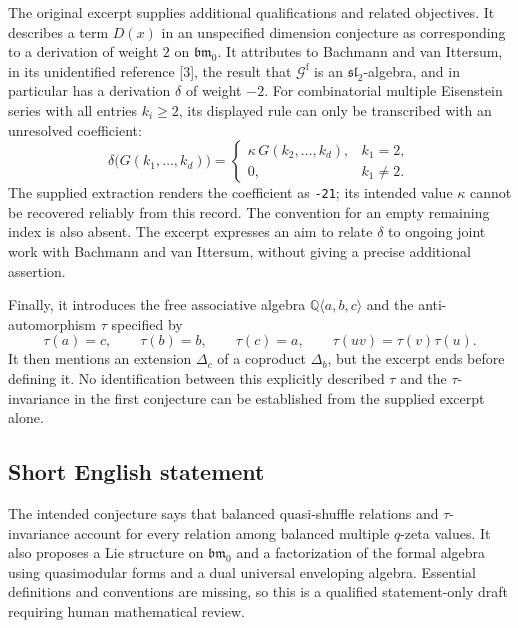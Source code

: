 \documentclass[11pt]{article}
\begin{document}
The original excerpt supplies additional qualifications and related objectives. It describes a term \(D(x)\) in an unspecified dimension conjecture as corresponding to a derivation of weight \(2\) on \(\mathfrak{bm}_0\). It attributes to Bachmann and van Ittersum, in its unidentified reference [3], the result that \(\mathcal G^{\mathrm f}\) is an \(\mathfrak{sl}_2\)-algebra, and in particular has a derivation \(\delta\) of weight \(-2\). For combinatorial multiple Eisenstein series with all entries \(k_i\geq2\), its displayed rule can only be transcribed with an unresolved coefficient:
\[
\delta\bigl(G(k_1,\ldots,k_d)\bigr)=
\begin{cases}
\kappa\,G(k_2,\ldots,k_d),&k_1=2,\\
0,&k_1\ne2.
\end{cases}
\]
The supplied extraction renders the coefficient as \texttt{-21}; its intended value \(\kappa\) cannot be recovered reliably from this record. The convention for an empty remaining index is also absent. The excerpt expresses an aim to relate \(\delta\) to ongoing joint work with Bachmann and van Ittersum, without giving a precise additional assertion.

Finally, it introduces the free associative algebra \(\mathbb Q\langle a,b,c\rangle\) and the anti-automorphism \(\tau\) specified by
\[
\tau(a)=c,\qquad\tau(b)=b,\qquad\tau(c)=a,\qquad
\tau(uv)=\tau(v)\tau(u).
\]
It then mentions an extension \(\Delta_c\) of a coproduct \(\Delta_b\), but the excerpt ends before defining it. No identification between this explicitly described \(\tau\) and the \(\tau\)-invariance in the first conjecture can be established from the supplied excerpt alone.
\subsection{Short English statement}
The intended conjecture says that balanced quasi-shuffle relations and \(\tau\)-invariance account for every relation among balanced multiple \(q\)-zeta values. It also proposes a Lie structure on \(\mathfrak{bm}_0\) and a factorization of the formal algebra using quasimodular forms and a dual universal enveloping algebra. Essential definitions and conventions are missing, so this is a qualified statement-only draft requiring human mathematical review.
\end{document}
